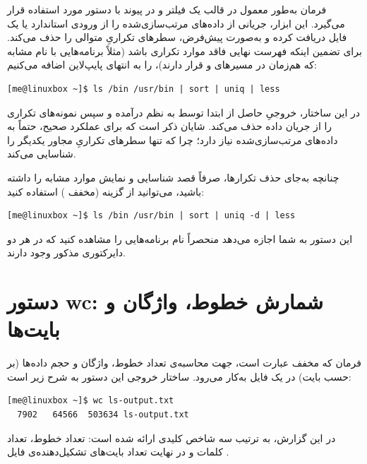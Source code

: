 فرمان  به‌طور معمول در قالب یک فیلتر و در پیوند با دستور  مورد استفاده قرار می‌گیرد. این ابزار، جریانی از داده‌های مرتب‌سازی‌شده را از ورودی استاندارد یا یک فایل دریافت کرده و به‌صورت پیش‌فرض، سطرهای تکراریِ متوالی را حذف می‌کند. برای تضمین اینکه فهرست نهایی فاقد موارد تکراری باشد (مثلاً برنامه‌هایی با نام مشابه که هم‌زمان در مسیرهای  و  قرار دارند)،  را به انتهای پایپ‌لاین اضافه می‌کنیم:

\begin{latin}
\begin{lstlisting}
[me@linuxbox ~]$ ls /bin /usr/bin | sort | uniq | less
\end{lstlisting}
\end{latin}

در این ساختار، خروجیِ حاصل از  ابتدا توسط  به نظم درآمده و سپس  نمونه‌های تکراری را از جریان داده حذف می‌کند. شایان ذکر است که  برای عملکرد صحیح، حتماً به داده‌های مرتب‌سازی‌شده نیاز دارد؛ چرا که تنها سطرهای تکراریِ مجاور یکدیگر را شناسایی می‌کند.

چنانچه به‌جای حذف تکرارها، صرفاً قصد شناسایی و نمایش موارد مشابه را داشته باشید، می‌توانید از گزینه  (مخفف ) استفاده کنید:

\begin{latin}
\begin{lstlisting}
[me@linuxbox ~]$ ls /bin /usr/bin | sort | uniq -d | less
\end{lstlisting}
\end{latin}

این دستور به شما اجازه می‌دهد منحصراً نام برنامه‌هایی را مشاهده کنید که در هر دو دایرکتوری مذکور وجود دارند.

\section{دستور wc: شمارش خطوط، واژگان و بایت‌ها}

فرمان  که مخفف عبارت  است، جهت محاسبه‌ی تعداد خطوط، واژگان و حجم داده‌ها (بر حسب بایت) در یک فایل به‌کار می‌رود. ساختار خروجی این دستور به شرح زیر است:

\begin{latin}
\begin{lstlisting}
[me@linuxbox ~]$ wc ls-output.txt
  7902   64566  503634 ls-output.txt
\end{lstlisting}
\end{latin}

در این گزارش، به ترتیب سه شاخص کلیدی ارائه شده است: تعداد خطوط، تعداد کلمات و در نهایت تعداد بایت‌های تشکیل‌دهنده‌ی فایل .

